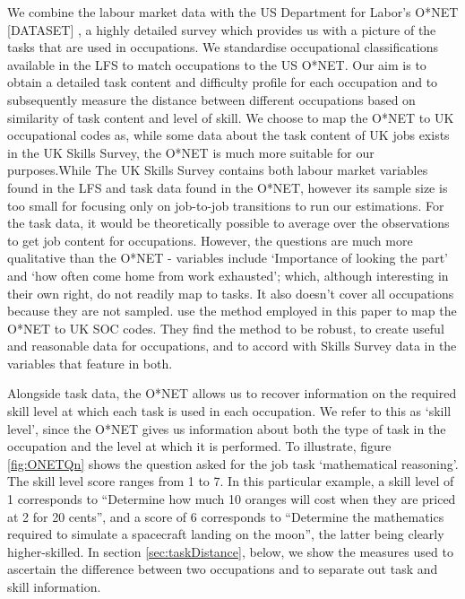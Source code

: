 \documentclass[12pt,authoryear]{elsarticle}
\begin{document}
	We combine the labour market data with the US Department for Labor's O*NET [DATASET] \cite{ONET}, a highly detailed survey which provides us with a picture of the tasks that are used in occupations. We standardise occupational classifications available in the LFS to match occupations to the US O*NET. Our aim is to obtain a detailed task content and difficulty profile for each occupation and to subsequently measure the distance between different occupations based on similarity of task content and level of skill. We choose to map the O*NET to UK occupational codes as, while some data about the task content of UK jobs exists in the UK Skills Survey, the O*NET is much more suitable for our purposes.While The UK Skills Survey contains both labour market variables found in the LFS and task data found in the O*NET, however its sample size is too small for focusing only on job-to-job transitions to run our estimations. For the task data, it would be theoretically possible to average over the observations to get job content for occupations. However, the questions are much more qualitative than the O*NET - variables include `Importance of looking the part' and `how often come home from work exhausted'; which, although interesting in their own right, do not readily map to tasks. It also doesn't cover all occupations because they are not sampled. \cite{ONETreport} use the method employed in this paper to map the O*NET to UK SOC codes. They find the method to be robust, to create useful and reasonable data for occupations, and to accord with Skills Survey data in the variables that feature in both.
	
	Alongside task data, the O*NET allows us to recover information on the required skill level at which each task is used in each occupation. We refer to this as `skill level', since the O*NET gives us information about both the type of task in the occupation and the level at which it is performed. To illustrate, figure \ref{fig:ONETQn} shows the question asked for the job task `mathematical reasoning'. The skill level score ranges from 1 to 7. In this particular example, a skill level of 1 corresponds to ``Determine how much 10 oranges will cost when they are priced at 2 for 20 cents'', and a score of 6 corresponds to ``Determine the mathematics required to simulate a spacecraft landing on the moon'', the latter being clearly higher-skilled. In section \ref{sec:taskDistance}, below, we show the measures used to ascertain the difference between two occupations and to separate out task and skill information. 
	
\end{document}
